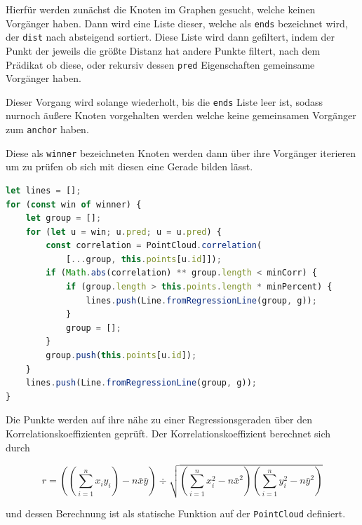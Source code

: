 Hierfür werden zunächst die Knoten im Graphen gesucht, welche keinen Vorgänger haben.
Dann wird eine Liste dieser, welche als \lstinline{ends} bezeichnet wird, der \lstinline{dist} nach absteigend sortiert.
Diese Liste wird dann gefiltert, indem der Punkt der jeweils die grö{\ss}te Distanz hat andere Punkte filtert, nach dem Prädikat ob diese, oder rekursiv dessen \lstinline{pred} Eigenschaften gemeinsame Vorgänger haben.

Dieser Vorgang wird solange wiederholt, bis die \lstinline{ends} Liste leer ist, sodass nurnoch äu{\ss}ere Knoten vorgehalten werden welche keine gemeinsamen Vorgänger zum \lstinline{anchor} haben.

Diese als \lstinline{winner} bezeichneten Knoten werden dann über ihre Vorgänger iterieren um zu prüfen ob sich mit diesen eine Gerade bilden lässt.

\begin{lstlisting}[language=JavaScript, caption={Bestimmung der äu{\ss}ersten Knoten zur Bestimmung von Geraden durch den Korrelationskoeffizienten in der \lstinline{groupsByCorrelation} Funktion innerhalb der \lstinline{Dijkstra} Klasse.}, label={lst:dijkstra_correlation_part2}]
let lines = [];
for (const win of winner) {
    let group = [];
    for (let u = win; u.pred; u = u.pred) {
        const correlation = PointCloud.correlation(
            [...group, this.points[u.id]]);
        if (Math.abs(correlation) ** group.length < minCorr) {
            if (group.length > this.points.length * minPercent) {
                lines.push(Line.fromRegressionLine(group, g));
            }
            group = [];
        }
        group.push(this.points[u.id]);
    }
    lines.push(Line.fromRegressionLine(group, g));
}
\end{lstlisting}

Die Punkte werden auf ihre nähe zu einer Regressionsgeraden über den Korrelationskoeffizienten geprüft.
Der Korrelationskoeffizient berechnet sich durch~\cite{Papula2014}

\begin{equation}
    r = \left(\left(\sum_{i=1}^n x_i y_i\right) - n \bar{x} \bar{y}\right) \div \sqrt{\left(\sum_{i=1}^n x_i^2 - n\bar{x}^2\right)\left(\sum_{i=1}^n y_i^2 - n \bar{y}^2\right)}
    \label{eq:korrelationskoeffizient}
\end{equation}

und dessen Berechnung ist als statische Funktion auf der \lstinline{PointCloud} definiert.

